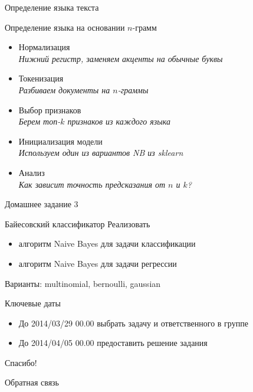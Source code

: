 \documentclass[10pt,a4paper]{beamer}
\begin{document}

\begin{frame}{Определение языка текста}

Определение языка на основании $n$-грамм

\begin{itemize}
\item Нормализация \\
{\it Нижний регистр, заменяем акценты на обычные буквы}
\item Токенизация \\
{\it Разбиваем документы на $n$-граммы}
\item Выбор признаков \\
{\it Берем топ-$k$ признаков из каждого языка}
\item Инициализация модели \\
{\it Используем один из вариантов NB из sklearn}
\item Анализ \\
{\it Как зависит точность предсказания от $n$ и $k$?}
\end{itemize}

\end{frame}


\begin{frame}{Домашнее задание 3}

\begin{block}{Байесовский классификатор}
Реализовать
\begin{itemize}
\item алгоритм Naive Bayes для задачи классификации
\item алгоритм Naive Bayes для задачи регрессии
\end{itemize}
\end{block}

Варианты: multinomial, bernoulli, gaussian

\vspace{1em}
Ключевые даты
\begin{itemize}
\item До 2014/03/29 00.00 выбрать задачу и ответственного в группе
\item До 2014/04/05 00.00 предоставить решение задания
\end{itemize}

\end{frame}


\begin{frame}{Спасибо!}

\begin{center}
{\Large Обратная связь}
\end{center}

\end{frame}
\end{document}
